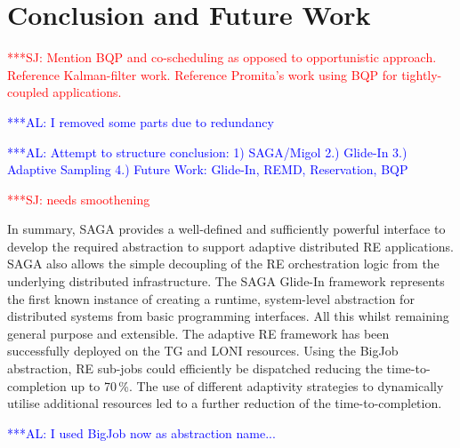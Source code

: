\documentclass{rspublic}
\newcommand{\alnote}[1]{ {\textcolor{blue} { ***AL: #1 }}}
\newcommand{\jhanote}[1]{ {\textcolor{red} { ***SJ: #1 }}}
\newcommand{\alnote}[1]{}
\newcommand{\jhanote}[1]{}
\newcommand{\glidein}[1]{Glide-In }
\begin{document}
\section{Conclusion and Future Work}

\jhanote{Mention BQP and co-scheduling as opposed to opportunistic
  approach. Reference Kalman-filter work. Reference Promita's work
  using BQP for tightly-coupled applications.} 
                
\alnote{I removed some parts due to redundancy}

\alnote{Attempt to structure conclusion: 1) SAGA/Migol 2.) Glide-In
  3.) Adaptive Sampling 4.) Future Work: Glide-In, REMD, Reservation,
  BQP}
                                         
\jhanote{needs smoothening} 

In summary, SAGA provides a well-defined and sufficiently powerful
interface to develop the required abstraction to support adaptive
distributed RE applications.  SAGA also allows the simple decoupling
of the RE orchestration logic from the underlying distributed
infrastructure. The SAGA \glidein\ framework represents the first
known instance of creating a runtime, system-level abstraction for
distributed systems from basic programming interfaces. All this whilst
remaining general purpose and extensible.  The adaptive RE framework
has been successfully deployed on the TG and LONI resources.  Using
the BigJob abstraction, RE sub-jobs could efficiently be dispatched
reducing the time-to-completion up to 70\,\%. The use of different
adaptivity strategies to dynamically utilise additional resources led
to a further reduction of the time-to-completion.


\alnote{I used BigJob now as abstraction name...}  

\end{document}
